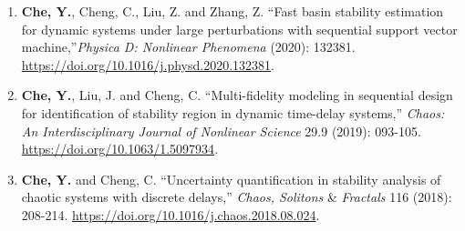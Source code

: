 \documentclass[10pt]{article}
\begin{document}
\begin{enumerate}
	\item {\bf Che, Y.}, Cheng, C., Liu, Z. and Zhang, Z. ``Fast basin stability estimation for dynamic systems under large perturbations with sequential support vector machine,''\textit{Physica D: Nonlinear Phenomena} (2020): 132381. \url{https://doi.org/10.1016/j.physd.2020.132381}.
	
	\item {\bf Che, Y.}, Liu, J.  and Cheng, C. ``Multi-fidelity modeling in sequential design for identification of stability region in dynamic time-delay systems,''  \textit{Chaos: An Interdisciplinary Journal of Nonlinear Science} 29.9 (2019): 093-105. \url{https://doi.org/10.1063/1.5097934}.
	
	\item {\bf Che, Y.} and Cheng, C. ``Uncertainty quantification in stability analysis of chaotic systems with discrete delays,'' \textit{Chaos, Solitons} \& \textit{Fractals} 116 (2018): 208-214. \url{https://doi.org/10.1016/j.chaos.2018.08.024}.
\end{enumerate}

\end{document}
